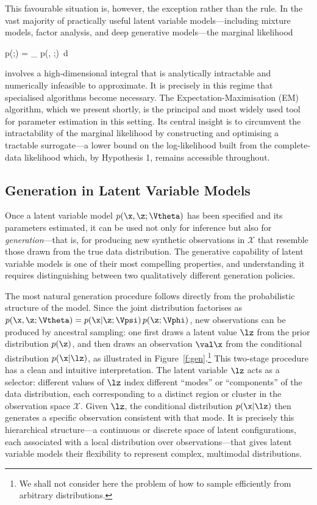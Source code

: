 This favourable situation is, however, the exception rather than the rule. In the vast
majority of practically useful latent variable models---including mixture models, factor
analysis, and deep generative models---the marginal likelihood
\begin{myequation}
p(\vlx;\prt) = \int_{\mZ} p(\vlx, \dz;\prt)\, d\dz
\end{myequation}
involves a high-dimensional integral that is analytically intractable and numerically
infeasible to approximate. It is precisely in this regime that specialised algorithms become
necessary. The \alert{Expectation-Maximisation} (EM) algorithm, which we present shortly,
is the principal and most widely used tool for parameter estimation in this setting. Its central
insight is to circumvent the intractability of the marginal likelihood by constructing and
optimising a tractable surrogate---a lower bound on the log-likelihood built from the
complete-data likelihood which, by Hypothesis 1, remains accessible throughout.

\subsection*{Generation in Latent Variable Models}

Once a latent variable model $p(\x,\z;\Vtheta)$ has been specified and its parameters
estimated, it can be used not only for inference but also for \emph{generation}---that is,
for producing new synthetic observations in $\mathcal{X}$ that resemble those drawn from
the true data distribution. The generative capability of latent variable models is one of their
most compelling properties, and understanding it requires distinguishing between two
qualitatively different generation policies.

The most natural generation procedure follows directly from the probabilistic structure of
the model. Since the joint distribution factorises as $p(\x,\z;\Vtheta) =
p(\x|\z;\Vpsi)\,p(\z;\Vphi)$, new observations can be produced by ancestral sampling: one
first draws a latent value $\lz$ from the prior distribution $p(\z)$, and then draws an
observation $\val\x$ from the conditional distribution $p(\x|\lz)$, as illustrated in
Figure~\ref{f:gen}.\footnote{We shall not consider here the problem of how to sample
efficiently from arbitrary distributions.} This two-stage procedure has a clean and intuitive
interpretation. The latent variable $\lz$ acts as a selector: different values of $\lz$ index
different ``modes'' or ``components'' of the data distribution, each corresponding to a
distinct region or cluster in the observation space $\mathcal{X}$. Given $\lz$, the
conditional distribution $p(\x|\lz)$ then generates a specific observation consistent with
that mode. It is precisely this hierarchical structure---a continuous or discrete space of
latent configurations, each associated with a local distribution over observations---that
gives latent variable models their flexibility to represent complex, multimodal distributions.

